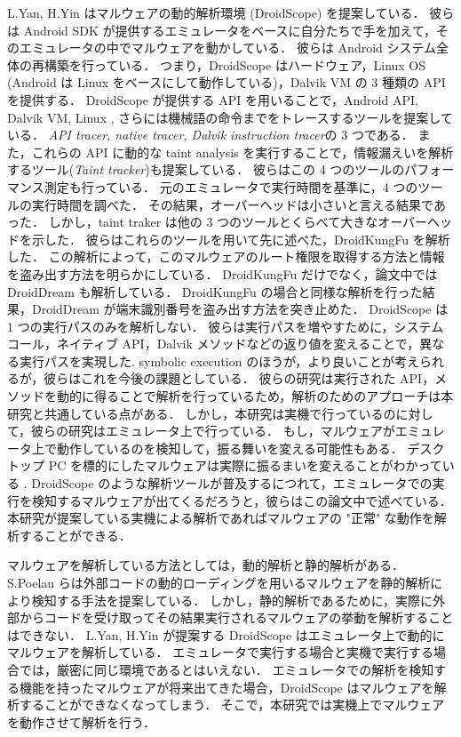 L.Yan, H.Yin はマルウェアの動的解析環境 (DroidScope) を提案している\cite{droidscope}．
彼らは Android SDK が提供するエミュレータをベースに自分たちで手を加えて，そのエミュレータの中でマルウェアを動かしている．
彼らは Android システム全体の再構築を行っている．
つまり，DroidScope はハードウェア，Linux OS (Android は Linux をベースにして動作している)，Dalvik VM の 3 種類の API を提供する．
DroidScope が提供する API を用いることで，Android API, Dalvik VM, Linux , さらには機械語の命令までをトレースするツールを提案している．
{\it API tracer, native tracer, Dalvik instruction tracer}の 3 つである．
また，これらの API に動的な taint analysis を実行することで，情報漏えいを解析するツール({\it Taint tracker})も提案している．
彼らはこの 4 つのツールのパフォーマンス測定も行っている．
元のエミュレータで実行時間を基準に，4 つのツールの実行時間を調べた．
その結果，オーバーヘッドは小さいと言える結果であった．
しかし，taint traker は他の 3 つのツールとくらべて大きなオーバーヘッドを示した．
彼らはこれらのツールを用いて先に述べた，DroidKungFu を解析した．
この解析によって，このマルウェアのルート権限を取得する方法と情報を盗み出す方法を明らかにしている．
DroidKungFu だけでなく，論文中では DroidDream も解析している．
DroidKungFu の場合と同様な解析を行った結果，DroidDream が端末識別番号を盗み出す方法を突き止めた．
DroidScope は 1 つの実行パスのみを解析しない．
彼らは実行パスを増やすために，システムコール，ネイティブ API，Dalvik メソッドなどの返り値を変えることで，異なる実行パスを実現した. 
symbolic execution のほうが，より良いことが考えられるが，彼らはこれを今後の課題としている．
彼らの研究は実行された API，メソッドを動的に得ることで解析を行っているため，解析のためのアプローチは本研究と共通している点がある．
しかし，本研究は実機で行っているのに対して，彼らの研究はエミュレータ上で行っている．
もし，マルウェアがエミュレータ上で動作しているのを検知して，振る舞いを変える可能性もある．
デスクトップ PC を標的にしたマルウェアは実際に振るまいを変えることがわかっている\cite{detection} \cite{emulation} \cite{v2e}. 
DroidScope のような解析ツールが普及するにつれて，エミュレータでの実行を検知するマルウェアが出てくるだろうと，彼らはこの論文中で述べている．
本研究が提案している実機による解析であればマルウェアの "正常" な動作を解析することができる．

マルウェアを解析している方法としては，動的解析と静的解析がある．
S.Poelau らは外部コードの動的ローディングを用いるマルウェアを静的解析により検知する手法を提案している．
しかし，静的解析であるために，実際に外部からコードを受け取ってその結果実行されるマルウェアの挙動を解析することはできない．
L.Yan, H.Yin が提案する DroidScope はエミュレータ上で動的にマルウェアを解析している．
エミュレータで実行する場合と実機で実行する場合では，厳密に同じ環境であるとはいえない．
エミュレータでの解析を検知する機能を持ったマルウェアが将来出てきた場合，DroidScope はマルウェアを解析することができなくなってしまう．
そこで，本研究では実機上でマルウェアを動作させて解析を行う．


